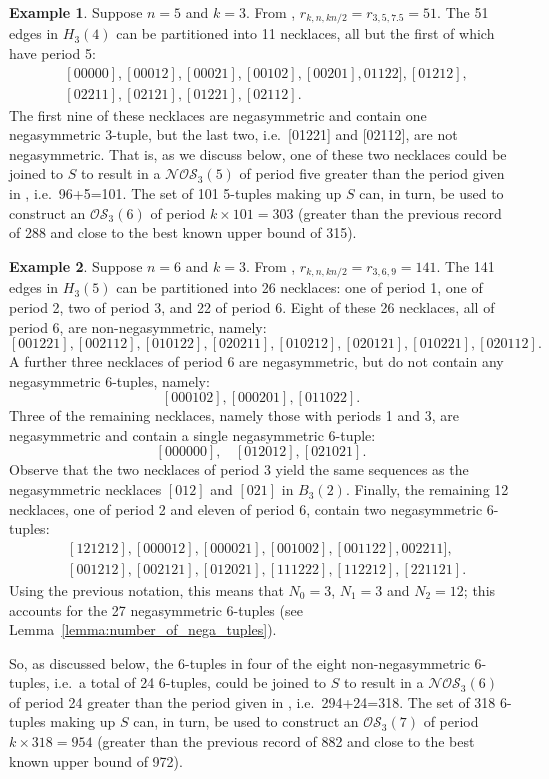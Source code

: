 \documentclass[a4paper,11pt]{article}
\theoremstyle{plain}
\theoremstyle{definition}
\newtheorem{example}{Example}[section]
\theoremstyle{remark}
\begin{document}
\begin{example}  \label{example:n5k3}
Suppose $n=5$ and $k=3$. From \cite[Table 2]{Mitchell25a}, $r_{k,n,kn/2}=r_{3,5,7.5}=51$. The 51
edges in $H_3(4)$ can be partitioned into 11 necklaces, all but the first of which have period 5:
\[
\begin{split}
 & [00000], [00012], [00021], [00102], [00201], 01122], [01212], \\
 & [02211], [02121], [01221], [02112].
\end{split}
\]
The first nine of these necklaces are negasymmetric and contain one negasymmetric $3$-tuple, but
the last two, i.e.\ [01221] and [02112], are not negasymmetric. That is, as we discuss below, one
of these two necklaces could be joined to $S$ to result in a $\mathcal{NOS}_3(5)$ of period five
greater than the period given in \cite[Table 3]{Mitchell25a}, i.e.\ 96+5=101.  The set of 101
5-tuples making up $S$ can, in turn, be used to construct an $\mathcal{OS}_3(6)$ of period
$k\times101=303$ (greater than the previous record of 288 and close to the best known upper bound
of 315).
\end{example}

\begin{example}  \label{example:n6k3}
Suppose $n=6$ and $k=3$. From \cite[Table 2]{Mitchell25a}, $r_{k,n,kn/2}=r_{3,6,9}=141$.  The 141
edges in $H_3(5)$ can be partitioned into 26 necklaces: one of period 1, one of period 2, two of
period 3, and 22 of period 6.  Eight of these 26 necklaces, all of period 6, are non-negasymmetric,
namely:
\[ [001221], [002112], [010122], [020211], [010212], [020121], [010221], [020112]. \]
A further three necklaces of period 6 are negasymmetric, but do not contain any negasymmetric
6-tuples, namely:
\[ [000102], [000201], [011022]. \]
Three of the remaining necklaces, namely those with periods 1 and 3, are negasymmetric and contain
a single negasymmetric 6-tuple:
\[ [000000], ~~~~[012012], [021021]. \]
Observe that the two necklaces of period 3 yield the same sequences  as the negasymmetric necklaces
$[012]$ and $[021]$ in $B_3(2)$.  Finally, the remaining 12 necklaces, one of period 2 and eleven
of period 6, contain two negasymmetric 6-tuples:
\[
\begin{split}
 & [121212], [000012], [000021], [001002], [001122], 002211], \\
 & [001212], [002121], [012021], [111222], [112212], [221121].
\end{split}
\]
Using the previous notation, this means that $N_0=3$, $N_1=3$ and $N_2=12$; this
accounts for the 27 negasymmetric 6-tuples (see
Lemma~\ref{lemma:number_of_nega_tuples}).

So, as discussed below, the 6-tuples in four of the eight non-negasymmetric 6-tuples, i.e.\ a total
of 24 6-tuples, could be joined to $S$ to result in a $\mathcal{NOS}_3(6)$ of period 24 greater
than the period given in \cite[Table 3]{Mitchell25a}, i.e.\ 294+24=318. The set of 318 6-tuples
making up $S$ can, in turn, be used to construct an $\mathcal{OS}_3(7)$ of period $k\times318=954$
(greater than the previous record of 882 and close to the best known upper bound of 972).
\end{example}
\end{document}
